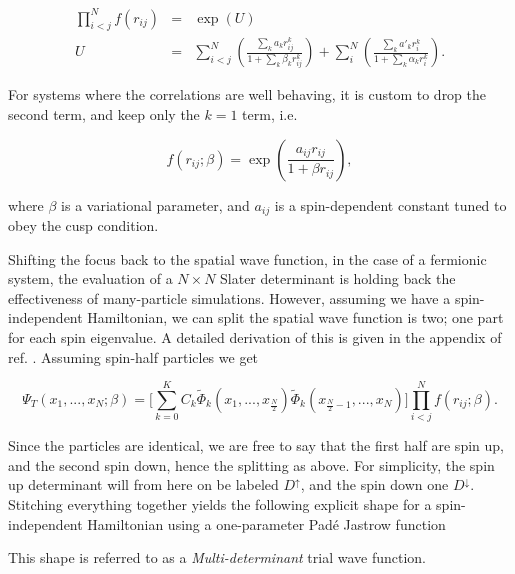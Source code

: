 \begin{eqnarray*}
 \prod_{i<j}^Nf(r_{ij}) &=& \exp(U) \\
         U &=&  \sum_{i<j}^N\left(\frac{\sum_k a_kr_{ij}^k}{1 + \sum_k \beta_kr_{ij}^k}\right) + \sum_i^N\left(\frac{\sum_k a'_kr_i^k}{1 + \sum_k \alpha_kr_i^k}\right).
\end{eqnarray*}

For systems where the correlations are well behaving, it is custom to drop the second term, and keep only the $k=1$ term, i.e.

\begin{equation}
 \label{eq:jastrow}
 f(r_{ij}; \beta) = \exp\left(\frac{a_{ij} r_{ij}}{1 + \beta r_{ij}}\right),
\end{equation}

where $\beta$ is a variational parameter, and $a_{ij}$ is a spin-dependent constant tuned to obey the cusp condition.

Shifting the focus back to the spatial wave function, in the case of a fermionic system, the evaluation of a $N\times N$ Slater determinant is holding back the effectiveness of many-particle simulations. However, assuming we have a spin-independent Hamiltonian, we can split the spatial wave function is two; one part for each spin eigenvalue. A detailed derivation of this is given in the appendix of ref. \cite{QMCPHD2008}. Assuming spin-half particles we get

\begin{equation}
 \Psi_T(x_1, ..., x_N; \beta) = \Big[\sum_{k=0}^K C_k\tilde\Phi_k(x_1, ..., x_{\frac{N}{2}})\tilde\Phi_k(x_{\frac{N}{2}-1}, ..., x_{N})\Big]\prod_{i<j}^Nf(r_{ij}; \beta).
\end{equation}

Since the particles are identical, we are free to say that the first half are spin up, and the second spin down, hence the splitting as above. For simplicity, the spin up determinant will from here on be labeled $D^\uparrow$, and the spin down one $D^\downarrow$. Stitching everything together yields the following explicit shape for a spin-independent Hamiltonian using a one-parameter Padé Jastrow function



This shape is referred to as a \textit{Multi-determinant} trial wave function. 

